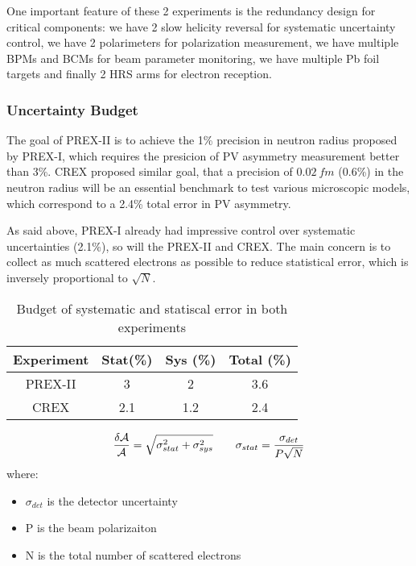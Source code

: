 One important feature of these 2 experiments is the redundancy design for critical
components: we have 2 slow helicity reversal for systematic uncertainty control,
we have 2 polarimeters for polarization measurement, we have multiple BPMs and
BCMs for beam parameter monitoring, we have multiple Pb foil targets and finally
2 HRS arms for electron reception.

\subsubsection{Uncertainty Budget}
The goal of PREX-II is to achieve the 1\% precision in \Pb neutron radius proposed
by PREX-I, which requires the presicion of PV asymmetry measurement better than 3\%. 
CREX proposed similar goal, that a precision of $0.02 \ fm$ (0.6\%) in the
\Ca neutron radius will be an essential benchmark to test various microscopic 
models, which correspond to a 2.4\% total error in PV asymmetry.

As said above, PREX-I already had impressive control over systematic uncertainties (2.1\%),
so will the PREX-II and CREX. The main concern is to collect as much scattered 
electrons as possible to reduce statistical error, which is inversely 
proportional to $\sqrt{N}$.
\begin{table}
    \centering
    \begin{tabular}{c| c c c}
	\hline
	Experiment  & Stat(\%)  & Sys (\%)  & Total (\%)    \\
	\hline
	PREX-II	& 3	& 2	& 3.6	\\ %
	CREX	& 2.1	& 1.2	& 2.4	\\
	\hline
    \end{tabular}
    \caption{Budget of systematic and statiscal error in both experiments 
    \cite{prex-II_proposal, crex_proposal}
    }
\end{table}

\begin{equation}
    \frac{\delta \mathcal{A}}{\mathcal{A}} = \sqrt{\sigma^2_{stat} + \sigma^2_{sys}}	\qquad 
    \sigma_{stat} = \frac{\sigma_{det}}{P\sqrt{N}}
\end{equation}
where:
\begin{itemize}
    \item $\sigma_{det}$ is the detector uncertainty
    \item P is the beam polarizaiton
    \item N is the total number of scattered electrons
\end{itemize}

